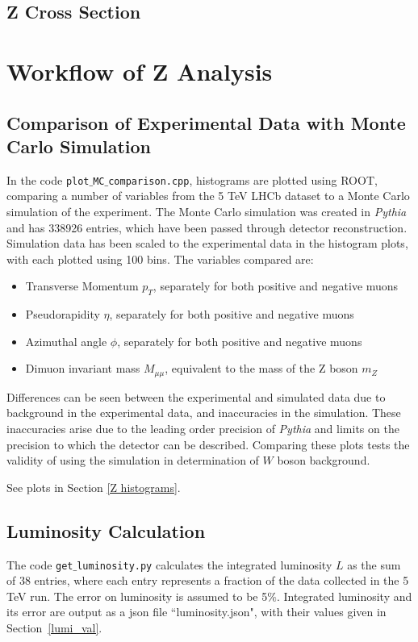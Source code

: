 \documentclass[a4paper]{article}
\begin{document}
\subsection{Z Cross Section} \label{xsec_val}



\section{Workflow of Z Analysis} \label{workflow}

\subsection{Comparison of Experimental Data with Monte Carlo Simulation} \label{sec: Z MC comparison}
In the code \texttt{plot$\_$MC$\_$comparison.cpp}, histograms are plotted using ROOT, comparing a number of variables from the 5 TeV LHCb dataset to a Monte Carlo simulation of the experiment. The Monte Carlo simulation was created in \textit{Pythia} and has 338926 entries, which have been passed through detector reconstruction. Simulation data has been scaled to the experimental data in the histogram plots, with each plotted using 100 bins.
The variables compared are:
\begin{itemize}
  \item Transverse Momentum $p_T$, separately for both positive and negative muons
  \item Pseudorapidity $\eta$, separately for both positive and negative muons
  \item Azimuthal angle $\phi$, separately for both positive and negative muons
  \item Dimuon invariant mass $M_{\mu\mu}$, equivalent to the mass of the Z boson $m_Z$
\end{itemize}

Differences can be seen between the experimental and simulated data due to background in the experimental data, and inaccuracies in the simulation. These inaccuracies arise due to the leading order precision of \textit{Pythia} and limits on the precision to which the detector can be described. 
Comparing these plots tests the validity of using the simulation in determination of $W$ boson background.

See plots in Section \ref{Z histograms}.

\subsection{Luminosity Calculation} \label{sec: Z lumi}
The code \texttt{get$\_$luminosity.py} calculates the integrated luminosity $L$ as the sum of 38 entries, where each entry represents a fraction of the data collected in the 5 TeV run.
The error on luminosity is assumed to be 5$\%$.
Integrated luminosity and its error are output as a json file ``luminosity.json", with their values given in Section~\ref{lumi_val}.
 
\end{document}
